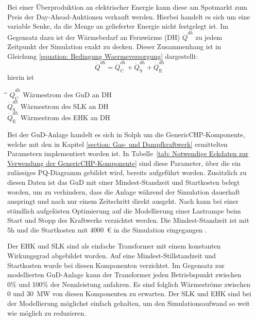 Bei einer Überproduktion an elektrischer Energie kann diese am Spotmarkt zum Preis der Day-Ahead-Auktionen verkauft werden. Hierbei handelt es sich um eine variable Senke, da die Menge an gelieferter Energie nicht festgelegt ist. Im Gegensatz dazu ist der Wärmebedarf an Fernwärme (\ac{DH}) $\dot{Q}^{dh}$ zu jedem Zeitpunkt der Simulation exakt zu decken. Dieser Zusammenhang ist in Gleichung \ref{equation: Bedingung Waermeversorgung} dargestellt:
	\begin{equation}
		\label{equation: Bedingung Waermeversorgung}
		\dot{Q}^{dh} = \dot{Q}_{\text{C}}^{dh} + \dot{Q}_{\text{S}}^{dh} + \dot{Q}_{\text{E}}^{dh}
	\end{equation} 
hierin ist
	\begin{tabbing}
		\hspace{0.5cm}\=\hspace{1cm}\=\hspace{0.5cm}\=\hspace{1cm}\=\kill
		\> $\dot{Q}_{\text{C}}^{dh}$ \>  \>  Wärmestrom des \ac{GuD} an \ac{DH}\\
		\> $\dot{Q}_{\text{S}}^{dh}$ \> \>  Wärmestrom des \ac{SLK} an \ac{DH}\\
		\> $\dot{Q}_{\text{E}}^{dh}$ \> \>  Wärmestrom des \ac{EHK} an \ac{DH}\\
	\end{tabbing} 

Bei der \ac{GuD}-Anlage handelt es sich in Solph um die GenericCHP-Komponente, welche mit den in Kapitel \ref{section: Gas- und Dampfkraftwerk} ermittelten Parametern implementiert worden ist. In Tabelle~\ref{tab: Notwendige Eckdaten zur Verwendung der GenericCHP-Komponente} sind diese Parameter, über die ein zulässiges PQ-Diagramm gebildet wird, bereits aufgeführt worden. Zusätzlich zu diesen Daten ist das \ac{GuD} mit einer Mindest-Standzeit und Startkosten belegt worden, um zu verhindern, dass die Anlage während der Simulation dauerhaft anspringt und nach nur einem Zeitschritt direkt ausgeht. Nach \citet{christidis2011} kann bei einer stündlich aufgelösten Optimierung auf die Modellierung einer Lastrampe beim Start und Stopp des Kraftwerks verzichtet werden. Die Mindest-Standzeit ist mit 5h und die Startkosten mit 4000~$\euro$ in die Simulation eingegangen \cite{christidis2011}. 

Der \ac{EHK} und \ac{SLK} sind als einfache Transformer mit einem konstanten Wirkungsgrad abgebildet worden. Auf eine Mindest-Stillstandzeit und Startkosten wurde bei diesen Komponenten verzichtet. Im Gegensatz zur modellierten \ac{GuD}-Anlage kann der Transformer jeden Betriebspunkt zwischen 0\% und 100\% der Nennleistung  anfahren. Es sind folglich Wärmeströme zwischen 0 und 30~MW von diesen Komponenten zu erwarten. Der \ac{SLK} und \ac{EHK} sind bei der Modellierung möglichst einfach gehalten, um den Simulationsaufwand so weit wie möglich zu reduzieren. 

